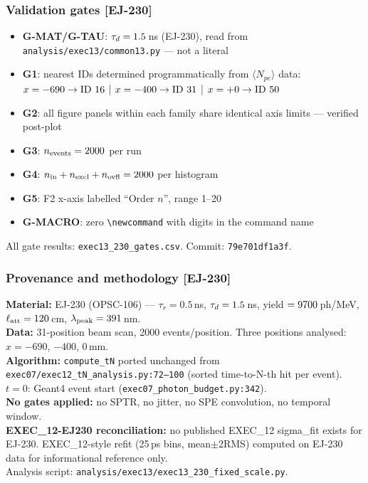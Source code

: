 \documentclass[aspectratio=169]{beamer}
\begin{document}
\begin{frame}
\frametitle{Validation gates [EJ-230]}
\small
\begin{itemize}
  \item \textbf{G-MAT/G-TAU}: $\tau_d=1.5$\,ns (EJ-230), read from
        \texttt{analysis/exec13/common13.py} --- not a literal
  \item \textbf{G1}: nearest IDs determined programmatically from $\langle N_{pe}\rangle$
        data: $x=-690\to\text{ID }16$ | $x=-400\to\text{ID }31$ | $x=+0\to\text{ID }50$
  \item \textbf{G2}: all figure panels within each family share identical axis limits
        --- verified post-plot
  \item \textbf{G3}: $n_{\rm events}=2000$ per run
  \item \textbf{G4}: $n_{\rm in}+n_{\rm excl}+n_{\rm ovfl}=2000$ per histogram
  \item \textbf{G5}: F2 x-axis labelled ``Order $n$'', range 1--20
  \item \textbf{G-MACRO}: zero \texttt{\textbackslash newcommand} with digits in the command name
\end{itemize}
\vspace{3pt}
\scriptsize All gate results: \texttt{exec13\_230\_gates.csv}.
Commit: \texttt{79e701df1a3f}.

\end{frame}

\begin{frame}
\frametitle{Provenance and methodology [EJ-230]}
\small
\textbf{Material:} EJ-230 (OPSC-106) --- $\tau_r=0.5$\,ns, $\tau_d=1.5$\,ns,
yield $=9700$\,ph/MeV, $\ell_{\rm att}=120$\,cm, $\lambda_{\rm peak}=391$\,nm.\\[4pt]
\textbf{Data:} 31-position beam scan, 2000 events/position.
Three positions analysed: $x=-690$, $-400$, $0$\,mm.\\[4pt]
\textbf{Algorithm:} \texttt{compute\_tN} ported unchanged from
\texttt{exec07/exec12\_tN\_analysis.py:72--100} (sorted time-to-N-th hit per event).
$t=0$: Geant4 event start (\texttt{exec07\_photon\_budget.py:342}).\\[4pt]
\textbf{No gates applied:} no SPTR, no jitter, no SPE convolution, no temporal window.\\[4pt]
\textbf{EXEC\_12-EJ230 reconciliation:} no published EXEC\_12 sigma\_fit exists for EJ-230.
EXEC\_12-style refit (25\,ps bins, mean$\pm$2RMS) computed on EJ-230 data for
informational reference only.\\[4pt]
\scriptsize Analysis script: \texttt{analysis/exec13/exec13\_230\_fixed\_scale.py}.

\end{frame}
\end{document}
